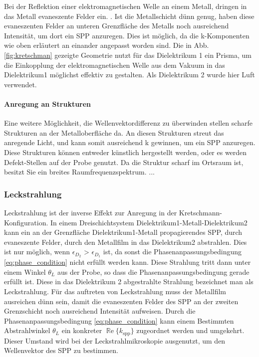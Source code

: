 \documentclass{article}
\begin{document}
			Bei der Reflektion einer elektromagnetischen Welle an einem Metall, dringen in das Metall evaneszente Felder ein. \cite{Novotny.2012b}. Ist die Metallschicht dünn genug, haben diese evaneszenten Felder an unteren Grenzfläche des Metalls noch ausreichend Intensität, um dort ein SPP anzuregen. Dies ist möglich, da die k-Komponenten wie oben erläutert an einander angepasst worden sind. Die in Abb. \ref{fig:kretschman} gezeigte Geometrie nutzt für das Dielektrikum 1 ein Prisma, um die Einkopplung der elektromagnetischen Welle aus dem Vakuum in das Dielektrikum1 möglichst effektiv zu gestalten. Als Dielektrikum 2 wurde hier Luft verwendet.			
		
			\paragraph{Anregung an Strukturen}
			Eine weitere Möglichkeit, die Wellenvektordifferenz zu überwinden stellen scharfe Strukturen an der Metalloberfläche da. An diesen Strukturen streut das anregende Licht, und kann somit ausreichend k gewinnen, um ein SPP anzuregen. Diese Strukturen können entweder künstlich hergestellt werden, oder es werden Defekt-Stellen auf der Probe genutzt. Da die Struktur scharf im Ortsraum ist, besitzt Sie ein breites Raumfrequenzspektrum.
			... 
		\subsubsection{Leckstrahlung}
			Leckstrahlung ist der inverse Effekt zur Anregung in der Kretschmann-Konfiguration. In einem Dreischichtsystem Dielektrikum1-Metall-Dielektrikum2 kann ein an der Grenzfläche Dielektrikum1-Metall propagierendes SPP, durch evaneszente Felder, durch den Metallfilm in das Dielektrikum2 abstrahlen. Dies ist nur möglich, wenn {$\epsilon_{D_2}$ > $\epsilon_{D_1}$} ist, da sonst die Phasenanpassungsbedingung \eqref{eq:phase_condition} nicht erfüllt werden kann. Diese Strahlung tritt dann unter einem Winkel $\theta_L$ aus der Probe, so dass die Phasenanpassungsbedingung gerade erfüllt ist. Diese in das Dielektrikum 2 abgestrahlte Strahlung bezeichnet man als Leckstrahlung. Für das auftreten von  Leckstrahlung muss der Metallfilm ausreichen dünn sein, damit die evaneszenten Felder des  SPP an der zweiten Grenzschicht noch ausreichend Intensität aufweisen. Durch die Phasenanpassungsbedingung \eqref{eq:phase_condition} kann einem Bestimmten Abstrahlwinkel $\theta_L$ ein konkreter $\operatorname{\mathbb{R}e}\{k_{\mathrm{spp}}\}$ zugeordnet werden und umgekehrt. Dieser Umstand wird bei der Leckstrahlmikroskopie ausgenutzt, um den Wellenvektor des SPP zu bestimmen.
\end{document}
